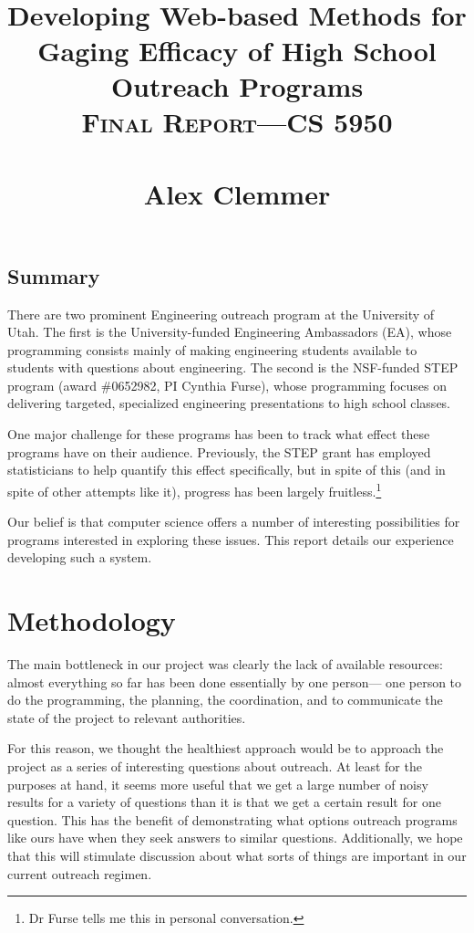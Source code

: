 \documentclass[11pt,a4paper]{article}
\title{
		\textsc{\LARGE }\\[1.5cm]
		\HRule \\[0.4cm]
		{ \huge \bfseries Developing Web-based Methods for Gaging Efficacy of High School Outreach Programs }\\		\textsc{Final Report---CS 5950 }\\
		\HRule \\[1.5cm]
		Alex Clemmer \\
}
\begin{document}
\maketitle

\pagebreak

\subsection*{Summary}

There are two prominent Engineering outreach program at the University of Utah. The first is the University-funded Engineering Ambassadors (EA), whose programming consists mainly of making engineering students available to students with questions about engineering. The second is the NSF-funded STEP program (award \#0652982, PI Cynthia Furse), whose programming focuses on delivering targeted, specialized engineering presentations to high school classes.

One major challenge for these programs has been to track what effect these programs have on their audience. Previously, the STEP grant has employed statisticians to help quantify this effect specifically, but in spite of this (and in spite of other attempts like it), progress has been largely fruitless.\footnote[1]{Dr Furse tells me this in personal conversation.}

Our belief is that computer science offers a number of interesting possibilities for programs interested in exploring these issues. This report details our experience developing  such a system.

\section{Methodology}

The main bottleneck in our project was clearly the lack of available resources: almost everything so far has been done essentially by one person--- one person to do the programming, the planning, the coordination, and to communicate the state of the project to relevant authorities.

For this reason, we thought the healthiest approach would be to approach the project as a series of interesting questions about outreach. At least for the purposes at hand, it seems more useful that we get a large number of noisy results for a variety of questions than it is that we get a certain result for one question. This has the benefit of demonstrating what options outreach programs like ours have when they seek answers to similar questions. Additionally, we hope that this will stimulate discussion about what sorts of things are important in our current outreach regimen.
\end{document}
